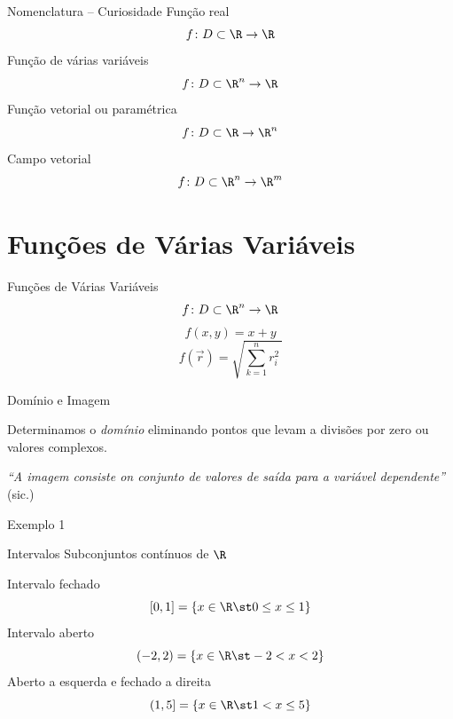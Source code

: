 \begin{frame}{Nomenclatura -- Curiosidade}
  Função real
  \[
    f\colon D \subset \R \to \R
  \]
  \pause
  Função de várias variáveis
  \[
    f\colon D \subset \R^n \to \R
  \]
  \pause
  Função vetorial ou paramétrica
  \[
    f\colon D \subset \R \to \R^n
  \]
  \pause
  Campo vetorial
  \[
    f\colon D \subset \R^n \to \R^m
  \]
\end{frame}

\section{Funções de Várias Variáveis}

\begin{frame}{Funções de Várias Variáveis}
  \[
    f\colon D \subset \R^n \to \R
  \]
  \pause
  \[
    f(x, y) = x + y
  \]
  \pause
  \[
    f(\vec{r}) = \sqrt{\sum_{k=1}^n r_i^2\,}
  \]
\end{frame}



\begin{frame}{Domínio e Imagem}

  Determinamos o \emph{domínio} eliminando pontos que levam a divisões por zero ou
  valores complexos.

  \pause
  \vspace{\baselineskip}

  \textit{``A \emph{imagem} consiste on conjunto de valores de saída para a variável dependente''} (sic.)

\end{frame}

\begin{frame}{Exemplo 1}
\end{frame}

\begin{frame}{Intervalos}
  Subconjuntos contínuos de $\R$
  \vspace{\baselineskip}

  \pause
  Intervalo fechado
  \[
    [0, 1] = \left\{ x\in\R\st 0 \leq x \leq 1 \right\}
  \]
  \pause
  Intervalo aberto
  \[
    (-2, 2) = \left\{ x\in\R\st -2 < x < 2 \right\}
  \]
  \pause
  Aberto a esquerda e fechado a direita
  \[
    (1, 5] = \left\{ x\in\R\st 1 < x \leq 5 \right\}
  \]
\end{frame}

